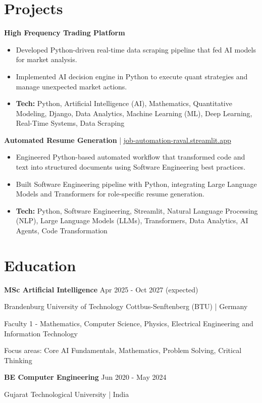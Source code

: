\documentclass[a4paper,10pt]{article}
\begin{document}
\section*{Projects}
\textbf{High Frequency Trading Platform}\par
\begin{itemize}
\item Developed Python-driven real-time data scraping pipeline that fed AI models for market analysis.
\item Implemented AI decision engine in Python to execute quant strategies and manage unexpected market actions.
\item \textbf{Tech:} Python, Artificial Intelligence (AI), Mathematics, Quantitative Modeling, Django, Data Analytics, Machine Learning (ML), Deep Learning, Real-Time Systems, Data Scraping
\end{itemize}
\vspace{3pt}
\textbf{Automated Resume Generation} | \href{https://job-automation-raval.streamlit.app/}{job-automation-raval.streamlit.app}\par
\begin{itemize}
\item Engineered Python-based automated workflow that transformed code and text into structured documents using Software Engineering best practices.
\item Built Software Engineering pipeline with Python, integrating Large Language Models and Transformers for role-specific resume generation.
\item \textbf{Tech:} Python, Software Engineering, Streamlit, Natural Language Processing (NLP), Large Language Models (LLMs), Transformers, Data Analytics, AI Agents, Code Transformation
\end{itemize}
\vspace{3pt}

\section*{Education}
\textbf{MSc Artificial Intelligence} \hfill Apr 2025 - Oct 2027 (expected)\par
Brandenburg University of Technology Cottbus-Senftenberg (BTU) | Germany\par
Faculty 1 - Mathematics, Computer Science, Physics, Electrical Engineering and Information Technology\par
Focus areas: Core AI Fundamentals, Mathematics, Problem Solving, Critical Thinking\par
\vspace{3pt}
\textbf{BE Computer Engineering} \hfill Jun 2020 - May 2024\par
Gujarat Technological University | India\par
\vspace{3pt}
\end{document}
